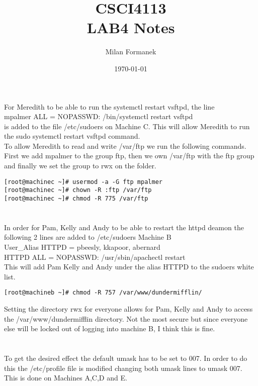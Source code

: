 \documentclass[11pt,onside]{article}
\title{\blue CSCI4113 \\
\blueb LAB4 Notes}
\author{Milan Formanek}
\date{\today} %
\begin{document}
\maketitle

\section{}
For Meredith to be able to run the systemctl restart vsftpd, the line\\ mpalmer ALL = NOPASSWD: /bin/systemctl restart vsftpd\\ is added to the file /etc/sudoers on Machine C. This will allow Meredith to run the sudo systemctl restart vsftpd command. \\

To allow Meredith to read and write /var/ftp we run the following commands. First we add mpalmer to the group ftp, then we own /var/ftp with the ftp group and finally we set the group to rwx on the folder.
\begin{lstlisting}
[root@machinec ~]# usermod -a -G ftp mpalmer
[root@machinec ~]# chown -R :ftp /var/ftp
[root@machinec ~]# chmod -R 775 /var/ftp
\end{lstlisting}

\section{}
In order for Pam, Kelly and Andy to be able to restart the httpd deamon the following 2 lines are added to /etc/sudoers Machine B \\
User\_Alias HTTPD = pbeesly, kkapoor, abernard \\
HTTPD ALL = NOPASSWD: /usr/sbin/apachectl restart \\
This will add Pam Kelly and Andy under the alias HTTPD to the sudoers white list. \\
\begin{lstlisting}
[root@machineb ~]# chmod -R 757 /var/www/dundermifflin/
\end{lstlisting}
Setting the directory rwx for everyone allows for Pam, Kelly and Andy to access the /var/www/dundermifflin directory. Not the most secure but since everyone else will be locked out of logging into machine B, I think this is fine.
\section{}
To get the desired effect the default umask has to be set to 007. In order to do this the /etc/profile file is modified changing both umask lines to umask 007. This is done on Machines A,C,D and E.
\end{document}
